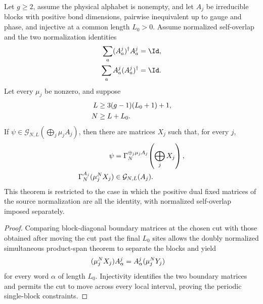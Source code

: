 \begin{lemma}
    \label{thm:block_diagonal_boundary_periodic_components_doubly_normalized}
    \leanok
    Let $g\ge2$, assume the physical alphabet is nonempty, and let $A_j$
    be irreducible blocks with positive bond dimensions, pairwise inequivalent
    up to gauge and phase, and injective at a common
    length $L_0>0$. Assume normalized self-overlap and the two normalization
    identities
    \begin{align}
        \sum_a(A^j_a)^\dagger A^j_a & =\Id,
        \notag                              \\
        \sum_aA^j_a(A^j_a)^\dagger  & =\Id.
        \notag
    \end{align}
    Let every $\mu_j$ be nonzero, and suppose
    \begin{align}
        L & \ge3(g-1)(L_0+1)+1,
        \notag                  \\
        N & \ge L+L_0.
        \notag
    \end{align}
    If $\psi\in\mathcal G_{N,L}(\bigoplus_j\mu_jA_j)$, then there are
    matrices $X_j$ such that, for every $j$,
    \begin{align}
        \psi
         & =\Gamma_N^{\oplus_j\mu_jA_j}\!\left(\bigoplus_jX_j\right),
        \notag                                                        \\
        \Gamma_N^{A_j}(\mu_j^NX_j)
         & \in\mathcal G_{N,L}(A_j).
        \notag
    \end{align}
    This theorem is restricted to the case in which the positive dual fixed
    matrices of the source normalization are all the identity, with normalized
    self-overlap imposed separately.
\end{lemma}

\begin{proof}\leanok
    Comparing block-diagonal boundary matrices at the chosen cut with those
    obtained after moving the cut past the final $L_0$ sites allows the doubly
    normalized simultaneous product-span theorem to separate the blocks and
    yield
    \begin{align}
        (\mu_j^NX_j)A^j_\alpha
         & =A^j_\alpha(\mu_j^NY_j)
        \notag
    \end{align}
    for every word $\alpha$ of length $L_0$. Injectivity identifies the two
    boundary matrices and permits the cut to move across every local interval,
    proving the periodic single-block constraints.
\end{proof}

